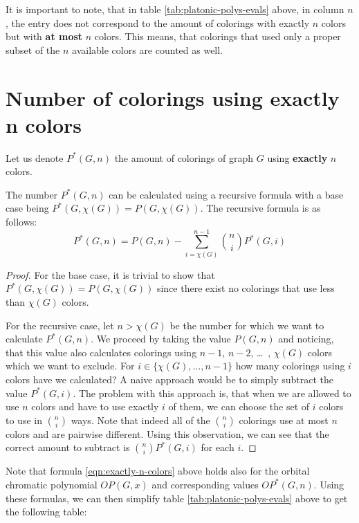 \begin{highlight}
It is important to note, that in table \ref{tab:platonic-polys-evals} above, in column $n$, the entry does not correspond to the amount of colorings with exactly $n$ colors but with \textbf{at most} $n$ colors. This means, that colorings that used only a proper subset of the $n$ available colors are counted as well.

\section{Number of colorings using exactly n colors}

\begin{defn}
    Let us denote $P^*(G,n)$ the amount of colorings of graph $G$ using \textbf{exactly} $n$ colors.
\end{defn}

The number $P^*(G,n)$ can be calculated using a recursive formula with a base case being $P^*(G,\chi(G))=P(G,\chi(G))$. The recursive formula is as follows:
\begin{equation}\label{eqn:exactly-n-colors}
P^*(G,n) = P(G,n) - \sum_{i=\chi(G)}^{n-1}\binom{n}{i}P^*(G,i)    
\end{equation}

\begin{proof}
    For the base case, it is trivial to show that $P^*(G,\chi(G))=P(G,\chi(G))$ since there exist no colorings that use less than $\chi(G)$ colors.
    
    For the recursive case, let $n>\chi(G)$ be the number for which we want to calculate $P^*(G,n)$. We proceed by taking the value $P(G,n)$ and noticing, that this value also calculates colorings using $n-1$, $n-2$, \ldots \ , $\chi(G)$ colors which we want to exclude. For $i \in \{\chi(G),\ldots,n-1\}$ how many colorings using $i$ colors have we calculated? A naive approach would be to simply subtract the value $P^*(G,i)$. The problem with this approach is, that when we are allowed to use $n$ colors and have to use exactly $i$ of them, we can choose the set of $i$ colors to use in $\binom{n}{i}$ ways. Note that indeed all of the $\binom{n}{i}$ colorings use at most $n$ colors and are pairwise different. Using this observation, we can see that the correct amount to subtract is $\binom{n}{i}P^*(G,i)$ for each $i$.
\end{proof}

Note that formula \ref{eqn:exactly-n-colors} above holds also for the orbital chromatic polynomial $OP(G,x)$ and corresponding values $OP^*(G,n)$. Using these formulas, we can then simplify table \ref{tab:platonic-polys-evals} above to get the following table:


\end{highlight}
